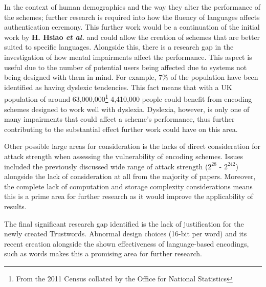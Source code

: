 In the context of human demographics and the way they alter the performance of the schemes; further research is required into how the fluency of languages affects authentication ceremony. This further work would be a continuation of the initial work by \textbf{H. Hsiao \textit{et al.}}\cite{hsiao2009study} and could allow the creation of schemes that are better suited to specific languages.
Alongside this, there is a research gap in the investigation of how mental impairments affect the performance. This aspect is useful due to the number of potential users being affected due to systems not being designed with them in mind. For example, 7\% of the population have been identified as having dyslexic tendencies\cite{peterson2012developmental}. This fact means that with a UK population of around 63,000,000\footnote{From the 2011 Census collated by the Office for National Statistics}  4,410,000 people could benefit from encoding schemes designed to work well with dyslexia. Dyslexia, however, is only one of many impairments that could affect a scheme's performance, thus further contributing to the substantial effect further work could have on this area.

Other possible large areas for consideration is the lacks of direct consideration for attack strength when assessing the vulnerability of encoding schemes. Issues included the previously discussed wide range of attack strength ($2^{28}$ - $2^{242}$) alongside the lack of consideration at all from the majority of papers. Moreover, the complete lack of computation and storage complexity considerations means this is a prime area for further research as it would improve the applicability of results.

The final significant research gap identified is the lack of justification for the newly created Trustwords. Abnormal design choices (16-bit per word) and its recent creation alongside the shown effectiveness of language-based encodings, such as words makes this a promising area for further research. 